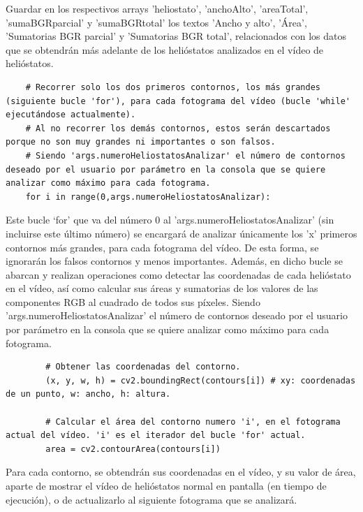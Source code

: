    Guardar en los respectivos arrays 'heliostato', 'anchoAlto', 'areaTotal', 'sumaBGRparcial' y 'sumaBGRtotal' los textos 'Ancho y alto', 'Área', 'Sumatorias BGR parcial' y 'Sumatorias BGR total', relacionados con los datos que se obtendrán más adelante de los helióstatos analizados en el vídeo de helióstatos.\\[20pt]

\begin{lstlisting}
    # Recorrer solo los dos primeros contornos, los más grandes (siguiente bucle 'for'), para cada fotograma del vídeo (bucle 'while' ejecutándose actualmente).
    # Al no recorrer los demás contornos, estos serán descartados porque no son muy grandes ni importantes o son falsos.
    # Siendo 'args.numeroHeliostatosAnalizar' el número de contornos deseado por el usuario por parámetro en la consola que se quiere analizar como máximo para cada fotograma.
    for i in range(0,args.numeroHeliostatosAnalizar):
\end{lstlisting}

Este bucle ‘for’ que va del número 0 al 'args.numeroHeliostatosAnalizar' (sin incluirse este último número) se encargará de analizar únicamente los 'x' primeros contornos más grandes, para cada fotograma del vídeo. De esta forma, se ignorarán los falsos contornos y menos importantes. Además, en dicho bucle se abarcan y realizan operaciones como detectar las coordenadas de cada helióstato en el vídeo, así como calcular sus áreas y sumatorias de los valores de las componentes RGB al cuadrado de todos sus píxeles. Siendo 'args.numeroHeliostatosAnalizar' el número de contornos deseado por el usuario por parámetro en la consola que se quiere analizar como máximo para cada fotograma.\\[20pt]        
        
\begin{lstlisting}
        # Obtener las coordenadas del contorno.
        (x, y, w, h) = cv2.boundingRect(contours[i]) # xy: coordenadas de un punto, w: ancho, h: altura.

        # Calcular el área del contorno numero 'i', en el fotograma actual del vídeo. 'i' es el iterador del bucle 'for' actual.
        area = cv2.contourArea(contours[i])
\end{lstlisting}
        
Para cada contorno, se obtendrán sus coordenadas en el vídeo, y su valor de área, aparte de mostrar el vídeo de helióstatos normal en pantalla (en tiempo de ejecución), o de actualizarlo al siguiente fotograma que se analizará.

